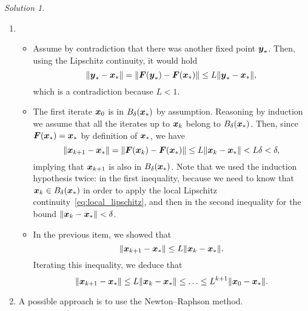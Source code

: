 \documentclass[11pt]{article}
\theoremstyle{definition}
\theoremstyle{remark}
\newtheorem*{solution}{Solution}
\begin{document}
\newpage
\begin{solution}
    $~$
    \begin{enumerate}
        \item {}
            \begin{itemize}

                \item
                    Assume by contradiction that there was another fixed point $\mathbf{\boldsymbol{y}}_*$.
                    Then, using the Lipschitz continuity, it would hold
                    \[
                        \lVert\mathbf{\boldsymbol{y}}_* - \mathbf{\boldsymbol{x}}_*\rVert = \lVert\mathbf{\boldsymbol{F}}(\mathbf{\boldsymbol{y}}_*) - \mathbf{\boldsymbol{F}}(\mathbf{\boldsymbol{x}}_*)\rVert \leq L \lVert\mathbf{\boldsymbol{y}}_* - \mathbf{\boldsymbol{x}}_*\rVert,
                    \]
                    which is a contradiction because $L < 1$.

                \item
                    The first iterate $\mathbf{\boldsymbol{x}}_0$ is in $B_{\delta}(\mathbf{\boldsymbol{x}}_*)$ by assumption.
                    Reasoning by induction we assume that all the iterates up to $\mathbf{\boldsymbol{x}}_k$ belong to $B_{\delta}(\mathbf{\boldsymbol{x}}_*)$.
                    Then, since $\mathbf{\boldsymbol{F}}(\mathbf{\boldsymbol{x}}_*) = \mathbf{\boldsymbol{x}}_*$ by definition of $\mathbf{\boldsymbol{x}}_*$,
                    we have
                    \[
                        \lVert\mathbf{\boldsymbol{x}}_{k+1} - \mathbf{\boldsymbol{x}}_*\rVert = \lVert\mathbf{\boldsymbol{F}}(\mathbf{\boldsymbol{x}}_{k}) - \mathbf{\boldsymbol{F}}(\mathbf{\boldsymbol{x}}_*)\rVert \leq L \lVert\mathbf{\boldsymbol{x}}_{k} - \mathbf{\boldsymbol{x}}_*\rVert < L \delta < \delta,
                    \]
                    implying that $\mathbf{\boldsymbol{x}}_{k+1}$ is also in $B_{\delta}(\mathbf{\boldsymbol{x}}_*)$.
                    Note that we used the induction hypothesis twice: in the first inequality,
                    because we need to know that $\mathbf{\boldsymbol{x}}_k \in B_{\delta}(\mathbf{\boldsymbol{x}}_*)$ in order to apply the local Lipschitz continuity~\eqref{eq:local_lipschitz},
                    and then in the second inequality for the bound $\lVert\mathbf{\boldsymbol{x}}_{k} - \mathbf{\boldsymbol{x}}_*\rVert < \delta$.

                \item
                    In the previous item, we showed that
                    \[
                        \lVert\mathbf{\boldsymbol{x}}_{k+1} - \mathbf{\boldsymbol{x}}_*\rVert \leq L \lVert\mathbf{\boldsymbol{x}}_{k} - \mathbf{\boldsymbol{x}}_*\rVert.
                    \]
                    Iterating this inequality, 
                    we deduce that
                    \[
                        \lVert\mathbf{\boldsymbol{x}}_{k+1} - \mathbf{\boldsymbol{x}}_*\rVert \leq L \lVert\mathbf{\boldsymbol{x}}_{k} - \mathbf{\boldsymbol{x}}_*\rVert \leq \dotsc \leq L^{k+1} \lVert\mathbf{\boldsymbol{x}}_{0} - \mathbf{\boldsymbol{x}}_*\rVert.
                    \]
            \end{itemize}

        \item
            A possible approach is to use the Newton--Raphson method.
    \end{enumerate}
\end{solution}
\end{document}
